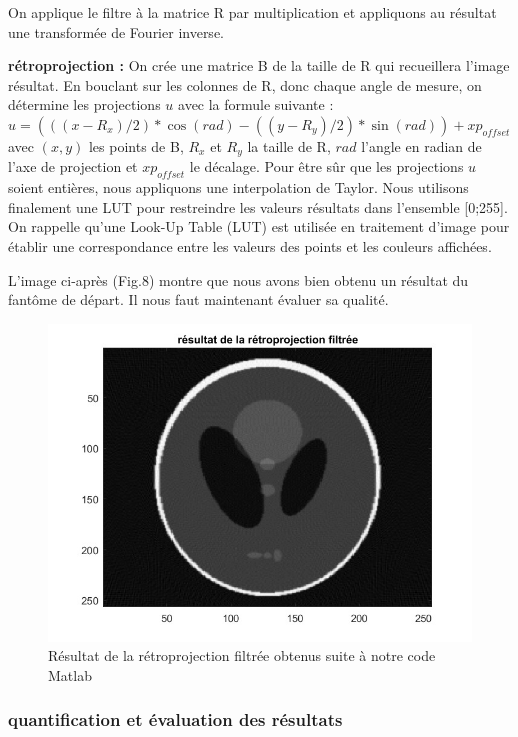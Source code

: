 \documentclass[conference]{IEEEtran}
\begin{document}
On applique le filtre à la matrice R par multiplication et appliquons au résultat une transformée de Fourier inverse.

\textbf{rétroprojection :} On crée une matrice B de la taille de R qui recueillera l'image résultat. En bouclant sur les colonnes de R, donc chaque angle de mesure, on détermine les projections $u$ avec la formule suivante :
$u=(((x-R_x)/2)*\cos(rad)-((y-R_y)/2)*\sin(rad))+xp_{offset}$
avec $(x,y)$ les points de B, $R_x$ et $R_y$ la taille de R, $rad$ l'angle en radian de l'axe de projection et $xp_{offset}$ le décalage.
Pour être sûr que les projections $u$ soient entières, nous appliquons une interpolation de Taylor.
Nous utilisons finalement une LUT pour restreindre les valeurs résultats dans l'ensemble [0;255].
On rappelle qu'une Look-Up Table (LUT) est utilisée en traitement d'image pour établir une correspondance entre les valeurs des points et les couleurs affichées.

L'image ci-après (Fig.8) montre que nous avons bien obtenu un résultat du fantôme de départ. Il nous faut maintenant évaluer sa qualité.

\begin{figure}[H]
\centering
\includegraphics[scale=0.5]{rsultat-de-la-rtroprojetion-filtre}
	\caption[Résultat de la rétroprojection filtrée obtenus suite à notre code Matlab]{Résultat de la rétroprojection filtrée obtenus suite à notre code Matlab}
\label{fig:gallery}
\end{figure}

\subsubsection{quantification et évaluation des résultats}
\end{document}
